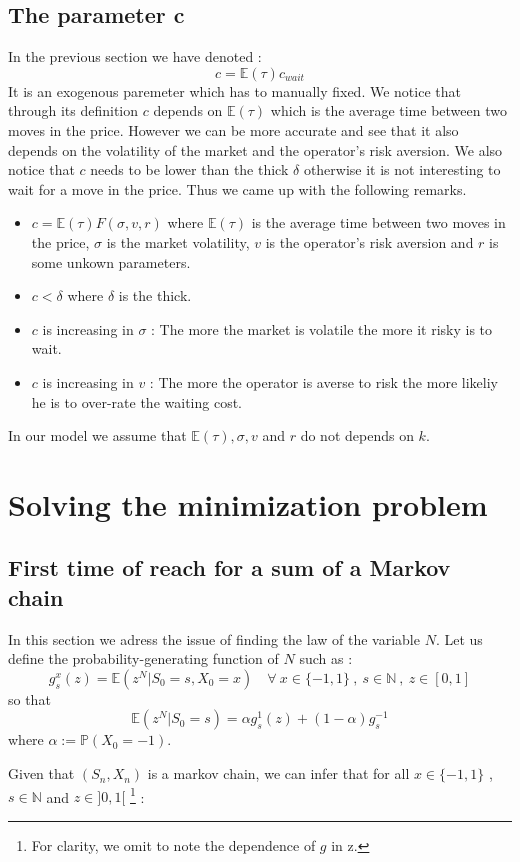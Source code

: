 \documentclass{article}
\begin{document}
\subsection{The parameter c}
In the previous section we have denoted :
$$
	c = \mathbb{E}(\tau) c_{wait}
$$
It is an exogenous paremeter which has to manually fixed. We notice that through its definition $c$ depends on $\mathbb{E}(\tau)$ which is the average time between two moves in the price. However we can be more accurate and see that it also depends on the volatility of the market and the operator's risk aversion. We also notice that $c$ needs to be lower than the thick $\delta$ otherwise it is not interesting to wait for a move in the price.
Thus we came up with the following remarks.
\begin{itemize}
\item $c = \mathbb{E}(\tau) F(\sigma,v,r)$ where $ \mathbb{E}(\tau)$ is the average time between two moves in the price, $\sigma$ is the market volatility, $v$ is the operator's risk aversion and $r$ is some unkown parameters. 
\item $c<\delta$ where $\delta$ is the thick.
\item $c$ is increasing in $\sigma$ : The more the market is volatile the more it risky is to wait.
\item $c$ is increasing in $v$ : The more the operator is averse to risk the more likeliy he is to over-rate the waiting cost. 
\end{itemize}
In our model we assume that $\mathbb{E}(\tau) , \sigma, v
$ and $r$ do not depends on $k$.

\newpage
\section{Solving the minimization problem}
\subsection{First time of reach for a sum of a Markov chain}
In this section we adress the issue of finding the law of the variable $N$. Let us define the  probability-generating function of $N$ such as :
$$ g_{s}^{x}(z) = \mathbb{E}(z^{N} | S_0=s, X_0=x) \quad \forall \ x \in \{-1,1\} \ , \ s \in \mathbb{N} \ , \ z \in [0,1]  $$
so that
$$\mathbb{E}(z^{N} | S_0=s) = \alpha  g_{s}^{1}(z) + (1-\alpha) g_{s}^{-1} $$
where $\alpha := \mathbb{P}(X_0 = -1)$.

Given that $(S_n, X_n)$ is a markov chain, we can infer that for all $x \in \{-1,1\}$ , $s \in \mathbb{N}$ and $z \in ]0,1[$ \footnote{For clarity, we omit to note the dependence of $g$ in z.} :
\end{document}
